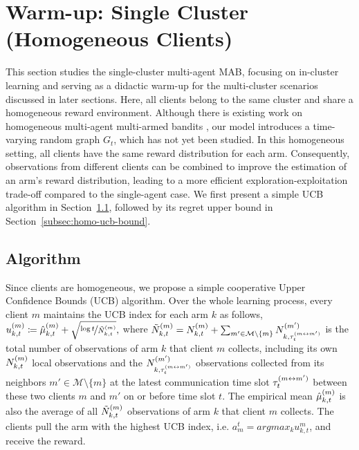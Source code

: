 \section{Warm-up: Single Cluster (Homogeneous Clients)}\label{sec:homo}

This section studies the single-cluster multi-agent MAB, focusing on in-cluster learning and serving as a didactic warm-up for the multi-cluster scenarios discussed in later sections. Here, all clients belong to the same cluster and share a homogeneous reward environment. Although there is existing work on homogeneous multi-agent multi-armed bandits \citep{wang2023achieve,wang2020optimal}, our model introduces a time-varying random graph $G_t$, which has not yet been studied.
In this homogeneous setting, all clients have the same reward distribution for each arm. Consequently, observations from different clients can be combined to improve the estimation of an arm's reward distribution, leading to a more efficient exploration-exploitation trade-off compared to the single-agent case.
We first present a simple UCB algorithm in Section~\ref{subsec:homo-ucb}, followed by its regret upper bound in Section~\ref{subsec:homo-ucb-bound}.




\subsection{Algorithm}\label{subsec:homo-ucb}

Since clients are homogeneous, we propose a simple cooperative Upper Confidence Bounds (UCB) algorithm. Over the whole learning process, every client \(m\) maintains the UCB index for each arm \(k\) as follows, $u_{k,t}^{(m)} \coloneqq \hat{\mu}_{k,t}^{(m)} + \sqrt{\nicefrac{\log t}{\tilde N_{k,t}^{(m)}}},$
where \(
\tilde N_{k,t}^{(m)} =
N_{k,t}^{(m)}
+ \sum_{m'\in\mathcal{M}\setminus \{m\}} N_{k,\tau_t^{(m\leftrightarrow m')}}^{(m')}
\)
is the total number of observations of arm \(k\) that client \(m\) collects, including its own \(N_{k,t}^{(m)}\) local observations and the \(N_{k,\tau_t^{(m\leftrightarrow m')}}^{(m')}\) observations collected from its neighbors \(m'\in\mathcal{M}\setminus \{m\}\) at the latest communication time slot \(\tau_t^{(m\leftrightarrow m')}\) between these two clients \(m\) and \(m'\) on or before time slot \(t\).
The empirical mean \(\hat\mu_{k,t}^{(m)}\) is also the average of all \(\tilde N_{k,t}^{(m)}\) observations of arm \(k\) that client \(m\) collects. The clients pull the arm with the highest UCB index, i.e. $a_m^t = argmax_{k}u_{k,t}^m$, and receive the reward.

